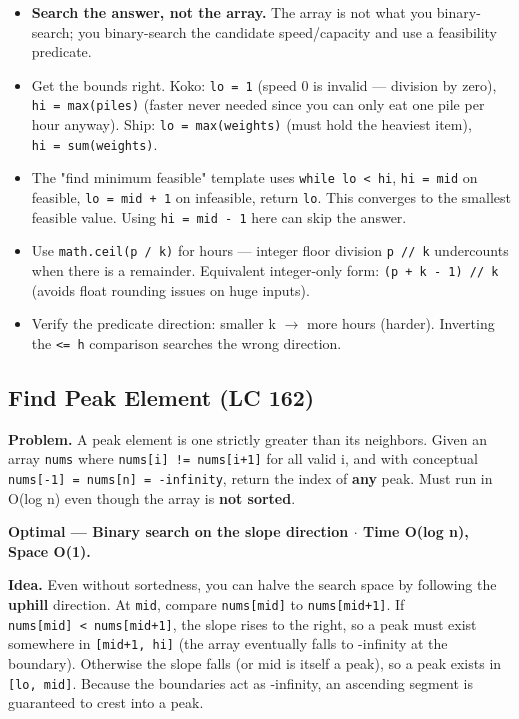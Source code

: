 \documentclass[11pt]{article}
\providecommand{\tightlist}{\setlength{\itemsep}{1pt}\setlength{\parskip}{0pt}}
\begin{document}
\begin{itemize}
\tightlist
\item
  \textbf{Search the answer, not the array.} The array is not what you binary-search; you binary-search the candidate speed/capacity and use a feasibility predicate.
\item
  Get the bounds right. Koko: \texttt{lo\ =\ 1} (speed 0 is invalid --- division by zero), \texttt{hi\ =\ max(piles)} (faster never needed since you can only eat one pile per hour anyway). Ship: \texttt{lo\ =\ max(weights)} (must hold the heaviest item), \texttt{hi\ =\ sum(weights)}.
\item
  The "find minimum feasible" template uses \texttt{while\ lo\ \textless{}\ hi}, \texttt{hi\ =\ mid} on feasible, \texttt{lo\ =\ mid\ +\ 1} on infeasible, return \texttt{lo}. This converges to the smallest feasible value. Using \texttt{hi\ =\ mid\ -\ 1} here can skip the answer.
\item
  Use \texttt{math.ceil(p\ /\ k)} for hours --- integer floor division \texttt{p\ //\ k} undercounts when there is a remainder. Equivalent integer-only form: \texttt{(p\ +\ k\ -\ 1)\ //\ k} (avoids float rounding issues on huge inputs).
\item
  Verify the predicate direction: smaller k \(\rightarrow\) more hours (harder). Inverting the \texttt{\textless{}=\ h} comparison searches the wrong direction.
\end{itemize}

\subsection{Find Peak Element (LC 162)}\label{find-peak-element-lc-162}

\textbf{Problem.} A peak element is one strictly greater than its neighbors. Given an array \texttt{nums} where \texttt{nums{[}i{]}\ !=\ nums{[}i+1{]}} for all valid i, and with conceptual \texttt{nums{[}-1{]}\ =\ nums{[}n{]}\ =\ -infinity}, return the index of \textbf{any} peak. Must run in O(log n) even though the array is \textbf{not sorted}.

\textbf{Optimal --- Binary search on the slope direction \(\cdot\) Time O(log n), Space O(1).}

\textbf{Idea.} Even without sortedness, you can halve the search space by following the \textbf{uphill} direction. At \texttt{mid}, compare \texttt{nums{[}mid{]}} to \texttt{nums{[}mid+1{]}}. If \texttt{nums{[}mid{]}\ \textless{}\ nums{[}mid+1{]}}, the slope rises to the right, so a peak must exist somewhere in \texttt{{[}mid+1,\ hi{]}} (the array eventually falls to -infinity at the boundary). Otherwise the slope falls (or mid is itself a peak), so a peak exists in \texttt{{[}lo,\ mid{]}}. Because the boundaries act as -infinity, an ascending segment is guaranteed to crest into a peak.
\end{document}
